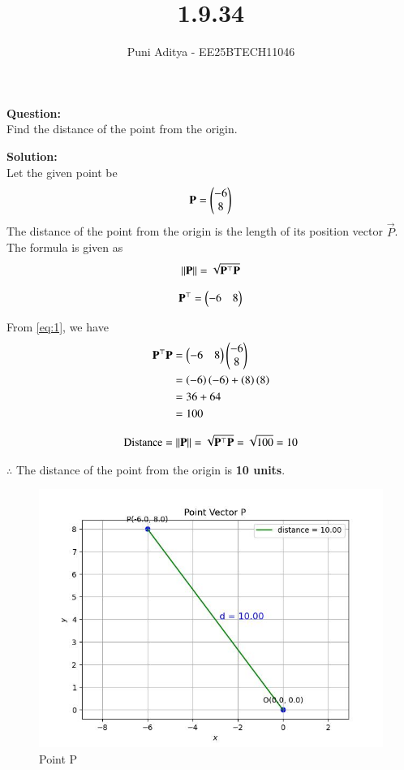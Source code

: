 \documentclass[journal]{IEEEtran}
\begin{document}
\title{1.9.34}
\author{Puni Aditya - EE25BTECH11046}
\maketitle

\textbf{Question:}\\
Find the distance of the point  from the origin.

\textbf{Solution:}\\
Let the given point be
\begin{align*}
    \mathbf{P} = \begin{pmatrix}-6 \\ 8\end{pmatrix}
\end{align*}
The distance of the point from the origin is the length of its position vector $\vec{P}$. The formula is given as 
\begin{align}
\left\lVert\mathbf{P}\right\rVert = \sqrt{\mathbf{P}^\top \mathbf{P}} \label{eq:1}
\end{align}

\begin{align*}
    \mathbf{P}^\top = \begin{pmatrix}-6 & 8\end{pmatrix}
\end{align*}

From \eqref{eq:1}, we have
\begin{align}
    \mathbf{P}^\top \mathbf{P} &= \begin{pmatrix}-6 & 8\end{pmatrix} \begin{pmatrix}-6 \\ 8\end{pmatrix} \\
    &= \left(-6\right)\left(-6\right) + \left(8\right)\left(8\right) \\
    &= 36 + 64 \\
    &= 100
\end{align}

\begin{align*}
    \text{Distance} = \left\lVert\mathbf{P}\right\rVert = \sqrt{\mathbf{P}^\top \mathbf{P}} = \sqrt{100} = 10
\end{align*}

$\therefore$ The distance of the point  from the origin is \textbf{10 units}.

\begin{figure}
    \centering
    \includegraphics[width=\columnwidth]{figs/plot_c.jpg}
    \caption*{Point P}
    \label{fig:fig}
\end{figure}
\end{document}
